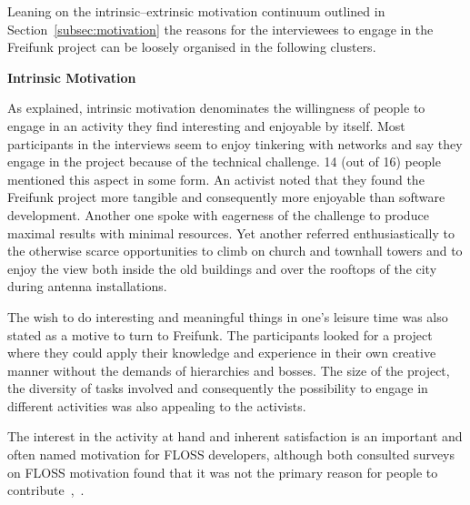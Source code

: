 \documentclass{scrartcl}
\begin{document}
Leaning on the intrinsic--extrinsic motivation continuum outlined in Section~\ref{subsec:motivation} the reasons for the interviewees to engage in the Freifunk project can be loosely organised in the following clusters.

\textbf{Intrinsic Motivation}

As explained, intrinsic motivation denominates the willingness of people to engage in an activity they find interesting and enjoyable by itself.
Most participants in the interviews seem to enjoy tinkering with networks and say they engage in the project because of the technical challenge.
14 (out of 16) people mentioned this aspect in some form.
An activist noted that they found the Freifunk project more tangible and consequently more enjoyable than software development.
Another one spoke with eagerness of the challenge to produce maximal results with minimal resources.
Yet another referred enthusiastically to the otherwise scarce opportunities to climb on church and townhall towers and to enjoy the view both inside the old buildings and over the rooftops of the city during antenna installations.

The wish to do interesting and meaningful things in one's leisure time was also stated as a motive to turn to Freifunk.
The participants looked for a project where they could apply their knowledge and experience in their own creative manner without the demands of hierarchies and bosses.
The size of the project, the diversity of tasks involved and consequently the possibility to engage in different activities was also appealing to the activists.

The interest in the activity at hand and inherent satisfaction is an important and often named motivation for FLOSS developers, although both consulted surveys on FLOSS motivation found that it was not the primary reason for people to contribute~\cite{HarOu2002},~\cite{LakWo2005}.
\end{document}

